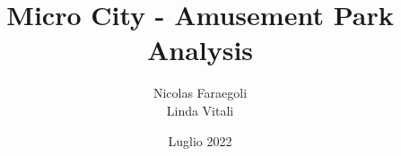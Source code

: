 \title{Micro City - Amusement Park Analysis}
\author{Nicolas Faraegoli\\
Linda Vitali}
\date{Luglio 2022}